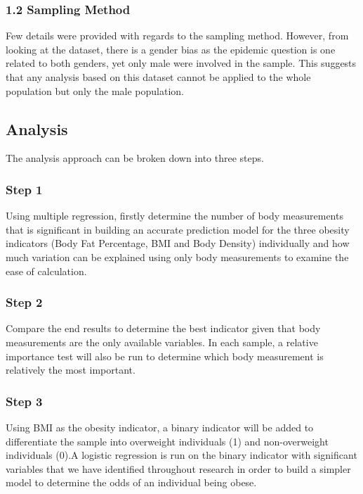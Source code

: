 \documentclass[a4paper,9pt,twocolumn,twoside,]{pinp}
\begin{document}
\hypertarget{sampling-method}{%
\subsubsection{1.2 Sampling Method}\label{sampling-method}}

Few details were provided with regards to the sampling method. However,
from looking at the dataset, there is a gender bias as the epidemic
question is one related to both genders, yet only male were involved in
the sample. This suggests that any analysis based on this dataset cannot
be applied to the whole population but only the male population.

\hypertarget{analysis}{%
\subsection{Analysis}\label{analysis}}

The analysis approach can be broken down into three steps.

\hypertarget{step-1}{%
\subsubsection{Step 1}\label{step-1}}

Using multiple regression, firstly determine the number of body
measurements that is significant in building an accurate prediction
model for the three obesity indicators (Body Fat Percentage, BMI and
Body Density) individually and how much variation can be explained using
only body measurements to examine the ease of calculation.

\hypertarget{step-2}{%
\subsubsection{Step 2}\label{step-2}}

Compare the end results to determine the best indicator given that body
measurements are the only available variables. In each sample, a
relative importance test will also be run to determine which body
measurement is relatively the most important.

\hypertarget{step-3}{%
\subsubsection{Step 3}\label{step-3}}

Using BMI as the obesity indicator, a binary indicator will be added to
differentiate the sample into overweight individuals (1) and
non-overweight individuals (0).A logistic regression is run on the
binary indicator with significant variables that we have identified
throughout research in order to build a simpler model to determine the
odds of an individual being obese.
\end{document}
